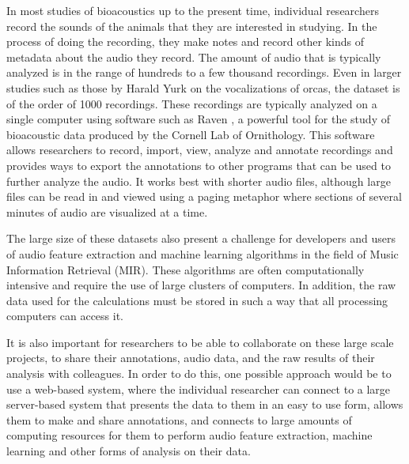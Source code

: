 \documentclass[12pt,oneside]{book}
\begin{document}
In most studies of bioacoustics up to the present time, individual
researchers record the sounds of the animals that they are interested
in studying.  In the process of doing the recording, they make notes
and record other kinds of metadata about the audio they record.  The
amount of audio that is typically analyzed is in the range of hundreds
to a few thousand recordings.  Even in larger studies such as those by
Harald Yurk \cite{yurk2002cultural} on the vocalizations of orcas, the dataset is of the order
of 1000 recordings.  These recordings are typically analyzed on a
single computer using software such as Raven \cite{cornell2011raven}, a
powerful tool for the study of bioacoustic data produced by the
Cornell Lab of Ornithology.  This software allows researchers to
record, import, view, analyze and annotate recordings and provides
ways to export the annotations to other programs that can be used to
further analyze the audio.  It works best with shorter audio files,
although large files can be read in and viewed using a paging
metaphor where sections of several minutes of audio are visualized at
a time.

The large size of these datasets also present a challenge for
developers and users of audio feature extraction and machine learning
algorithms in the field of Music Information Retrieval (MIR).  These
algorithms are often computationally intensive and require the use of
large clusters of computers.  In addition, the raw data used for the
calculations must be stored in such a way that all processing
computers can access it.

It is also important for researchers to be able to collaborate on
these large scale projects, to share their annotations, audio data,
and the raw results of their analysis with colleagues.  In order to do
this, one possible approach would be to use a web-based system, where
the individual researcher can connect to a large server-based system
that presents the data to them in an easy to use form, allows them to
make and share annotations, and connects to large amounts of computing
resources for them to perform audio feature extraction, machine
learning and other forms of analysis on their data.
 
\end{document}
